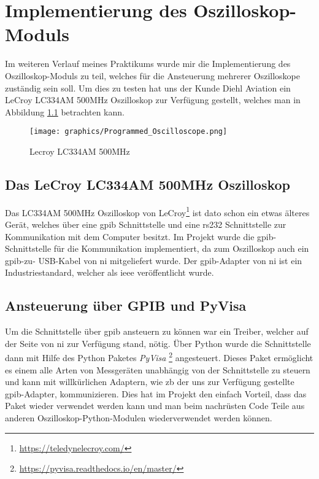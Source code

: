 \chapter{Implementierung des Oszilloskop-Moduls}
\label{ch:osci}

Im weiteren Verlauf meines Praktikums wurde mir die Implementierung des Oszilloskop-Moduls zu 
teil, welches für die Ansteuerung mehrerer Oszilloskope zuständig sein soll. Um dies zu testen 
hat uns der Kunde Diehl Aviation ein LeCroy LC334AM 500MHz Oszilloskop zur Verfügung gestellt, 
welches man in Abbildung \ref{fig:lc334am} betrachten kann.  

\begin{figure}[H]
	\centering
	\texttt{[image: graphics/Programmed\_Oscilloscope.png]}
	\caption{Lecroy LC334AM 500MHz}
	\label{fig:lc334am}
\end{figure}

\section{Das LeCroy LC334AM 500MHz Oszilloskop}
\label{sec:lc334am}

Das LC334AM 500MHz Oszilloskop von LeCroy\footnote{\url{https://teledynelecroy.com/}} ist dato 
schon ein etwas älteres Gerät, welches über eine \ac{gpib} Schnittstelle und eine \ac{rs232} 
Schnittstelle zur Kommunikation mit dem Computer besitzt. Im Projekt wurde die \ac{gpib}-
Schnittstelle für die Kommunikation implementiert, da zum Oszilloskop auch ein \ac{gpib}-zu-
USB-Kabel von \ac{ni} mitgeliefert wurde. Der \ac{gpib}-Adapter von \ac{ni} ist ein 
Industriestandard, welcher als \ac{ieee} veröffentlicht wurde.

\section{Ansteuerung über GPIB und PyVisa}
\label{sec:gpib}

Um die Schnittstelle über \ac{gpib} ansteuern zu können war ein Treiber, welcher auf der Seite 
von \ac{ni} zur Verfügung stand, nötig.
Über Python wurde die Schnittstelle dann mit Hilfe des Python Paketes \textit{PyVisa}
\footnote{\url{https://pyvisa.readthedocs.io/en/master/}} angesteuert. Dieses Paket ermöglicht 
es einem alle Arten von Messgeräten unabhängig von der Schnittstelle zu steuern und kann mit 
willkürlichen Adaptern, wie \ac{zb} der uns zur Verfügung gestellte \ac{gpib}-Adapter, 
kommunizieren. Dies hat im Projekt den einfach Vorteil, dass das Paket wieder verwendet werden 
kann und man beim nachrüsten Code Teile aus anderen Oszilloskop-Python-Modulen wiederverwendet 
werden können.

